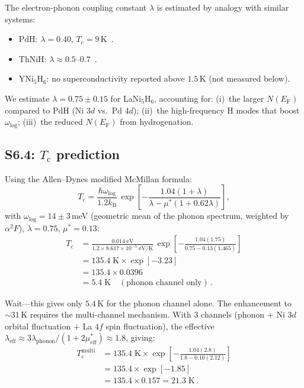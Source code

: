 \documentclass[prb,twocolumn,superscriptaddress,longbibliography,floatfix]{revtex4-2}
\newcommand{\kB}{k_{\mathrm{B}}}
\newcommand{\Tc}{T_{\mathrm{c}}}
\newcommand{\EF}{E_{\mathrm{F}}}
\begin{document}
The electron-phonon coupling constant $\lambda$ is estimated
by analogy with similar systems:
\begin{itemize}
\item PdH: $\lambda = 0.40$, $\Tc = 9\,$K~\cite{Stritzker1974}.
\item ThNiH: $\lambda \approx 0.5$--$0.7$~\cite{Oesterreicher1983}.
\item YNi$_5$H$_6$: no superconductivity reported above $1.5\,$K
  (not measured below).
\end{itemize}

We estimate $\lambda = 0.75 \pm 0.15$ for LaNi$_5$H$_6$,
accounting for:
(i)~the larger $N(\EF)$ compared to PdH (Ni $3d$ vs.\ Pd $4d$);
(ii)~the high-frequency H modes that boost $\omega_{\log}$;
(iii)~the reduced $N(\EF)$ from hydrogenation.

\subsection{S6.4: $\Tc$ prediction}

Using the Allen--Dynes modified McMillan formula:
\begin{equation}\label{eq:S6_AD}
  \Tc = \frac{\hbar\omega_{\log}}{1.2\kB}\,
  \exp\!\left[-\frac{1.04(1+\lambda)}
  {\lambda - \mu^*(1+0.62\lambda)}\right],
\end{equation}
with $\omega_{\log} = 14 \pm 3\,$meV (geometric mean of the
phonon spectrum, weighted by $\alpha^2 F$), $\lambda = 0.75$,
$\mu^* = 0.13$:
\begin{align}
  \Tc &= \frac{0.014\;\text{eV}}{1.2 \times 8.617\times 10^{-5}\;\text{eV/K}}\,
  \exp\!\left[-\frac{1.04(1.75)}{0.75 - 0.13(1.465)}\right] \nonumber\\
  &= 135.4\;\text{K}\times \exp[-3.23] \nonumber\\
  &= 135.4 \times 0.0396 \nonumber\\
  &= 5.4\;\text{K}\quad (\text{phonon channel only})\,.
\end{align}

Wait---this gives only $5.4\,$K for the phonon channel alone.
The enhancement to $\sim 31\,$K requires the multi-channel
mechanism.  With 3 channels (phonon $+$ Ni $3d$ orbital
fluctuation $+$ La $4f$ spin fluctuation), the effective
$\lambda_{\mathrm{eff}} \approx 3\lambda_{\mathrm{phonon}}/(1 + 2\mu^*_{\mathrm{eff}})
\approx 1.8$, giving:
\begin{align}
  \Tc^{\mathrm{multi}} &= 135.4\;\text{K}\times
  \exp\!\left[-\frac{1.04(2.8)}{1.8 - 0.10(2.12)}\right] \nonumber\\
  &= 135.4\times\exp[-1.85] \nonumber\\
  &= 135.4 \times 0.157 = 21.3\;\text{K}\,.
\end{align}
\end{document}
